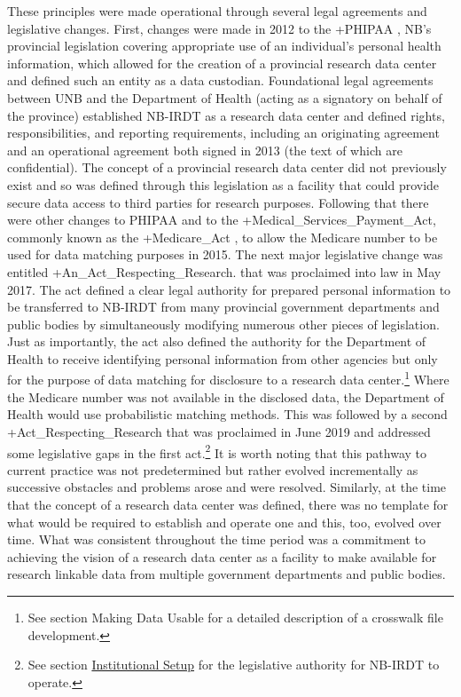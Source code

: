 \documentclass[
]{WileySix}
\begin{document}
These principles were made operational through several legal agreements and legislative changes. First, changes were made in 2012 to the +PHIPAA\textbar{} \citep{governmentofnewbrunswick2009}, NB's provincial legislation covering appropriate use of an individual's personal health information, which allowed for the creation of a provincial research data center and defined such an entity as a data custodian. Foundational legal agreements between UNB and the Department of Health (acting as a signatory on behalf of the province) established NB-IRDT as a research data center and defined rights, responsibilities, and reporting requirements, including an originating agreement and an operational agreement both signed in 2013 (the text of which are confidential). The concept of a provincial research data center did not previously exist and so was defined through this legislation as a facility that could provide secure data access to third parties for research purposes. Following that there were other changes to PHIPAA and to the +Medical\_Services\_Payment\_Act\textbar, commonly known as the +Medicare\_Act\textbar{} \citep{governmentofnewbrunswick2017}, to allow the Medicare number to be used for data matching purposes in 2015. The next major legislative change was entitled +An\_Act\_Respecting\_Research\textbar{}\citep{governmentofnewbrunswick2017a}. that was proclaimed into law in May 2017. The act defined a clear legal authority for prepared personal information to be transferred to NB-IRDT from many provincial government departments and public bodies by simultaneously modifying numerous other pieces of legislation. Just as importantly, the act also defined the authority for the Department of Health to receive identifying personal information from other agencies but only for the purpose of data matching for disclosure to a research data center.\footnote{See section Making Data Usable for a detailed description of a crosswalk file development.} Where the Medicare number was not available in the disclosed data, the Department of Health would use probabilistic matching methods. This was followed by a second +Act\_Respecting\_Research\textbar{} that was proclaimed in June 2019 and addressed some legislative gaps in the first act.\footnote{See section \protect\hyperlink{institutional-setup-8}{Institutional Setup} for the legislative authority for NB-IRDT to operate.} It is worth noting that this pathway to current practice was not predetermined but rather evolved incrementally as successive obstacles and problems arose and were resolved. Similarly, at the time that the concept of a research data center was defined, there was no template for what would be required to establish and operate one and this, too, evolved over time. What was consistent throughout the time period was a commitment to achieving the vision of a research data center as a facility to make available for research linkable data from multiple government departments and public bodies.
\end{document}
